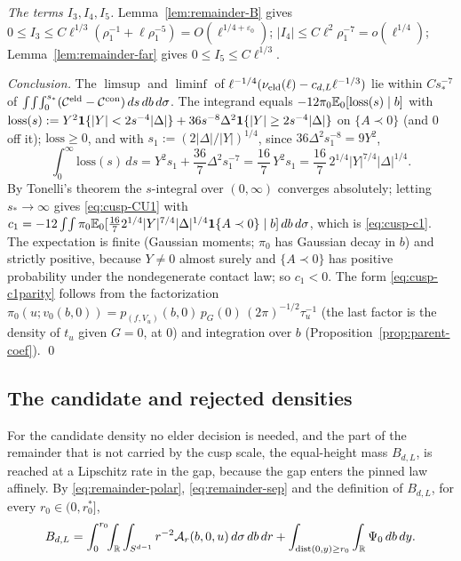 \emph{The terms $I_3,I_4,I_5$.} Lemma~\ref{lem:remainder-B} gives $0\le I_3\le C\ell^{1/3}(\rho_1^{-1}+\ell\rho_1^{-5})=O(\ell^{1/4+\varepsilon_0})$; $|I_4|\le C\ell^2\rho_1^{-7}=o(\ell^{1/4})$; Lemma~\ref{lem:remainder-far} gives $0\le I_5\le C\ell^{1/3}$.

\emph{Conclusion.} The $\limsup$ and $\liminf$ of $\ell^{-1/4}(\nu_{\mathrm{eld}}(\ell)-c_{d,L}\ell^{-1/3})$ lie within $Cs_*^{-7}$ of $\int\!\int\!\int_0^{s_*}(\mathcal C^{\mathrm{eld}}-\mathcal C^{\mathrm{con}})\,ds\,db\,d\sigma$. The integrand equals $-12\pi_0\mathbb E_0[\mathrm{loss}(s)\mid b]$ with $\mathrm{loss}(s):=Y^2\mathbf 1\{|Y|<2s^{-4}|\Delta|\}+36s^{-8}\Delta^2\mathbf 1\{|Y|\ge2s^{-4}|\Delta|\}$ on $\{A\prec0\}$ (and $0$ off it); $\mathrm{loss}\ge0$, and with $s_1:=(2|\Delta|/|Y|)^{1/4}$, since $36\Delta^2s_1^{-8}=9Y^2$,
\begin{equation}\label{eq:cusp-loss}
\int_0^\infty\mathrm{loss}(s)\,ds=Y^2s_1+\frac{36}7\Delta^2s_1^{-7}=\frac{16}7\,Y^2s_1=\frac{16}7\,2^{1/4}|Y|^{7/4}|\Delta|^{1/4}.
\end{equation}
By Tonelli's theorem the $s$-integral over $(0,\infty)$ converges absolutely; letting $s_*\to\infty$ gives \eqref{eq:cusp-CU1} with $c_1=-12\int\!\int\pi_0\mathbb E_0[\frac{16}72^{1/4}|Y|^{7/4}|\Delta|^{1/4}\mathbf 1\{A\prec0\}\mid b]\,db\,d\sigma$, which is \eqref{eq:cusp-c1}. The expectation is finite (Gaussian moments; $\pi_0$ has Gaussian decay in $b$) and strictly positive, because $Y\ne0$ almost surely and $\{A\prec0\}$ has positive probability under the nondegenerate contact law; so $c_1<0$. The form \eqref{eq:cusp-c1parity} follows from the factorization $\pi_0(u;v_0(b,0))=p_{(f,V_u)}(b,0)\,p_G(0)\,(2\pi)^{-1/2}\tau_u^{-1}$ (the last factor is the density of $t_u$ given $G=0$, at $0$) and integration over $b$ \cite[\S15]{parentP} (Proposition~\ref{prop:parent-coef}). \qed

\subsection{The candidate and rejected densities}\label{ssec:cusp-cand}

For the candidate density no elder decision is needed, and the part of the remainder that is not carried by the cusp scale, the equal-height mass $B_{d,L}$, is reached at a Lipschitz rate in the gap, because the gap enters the pinned law affinely. By \eqref{eq:remainder-polar}, \eqref{eq:remainder-sep} and the definition of $B_{d,L}$, for every $r_0\in(0,r_0^*]$,
\begin{equation}\label{eq:cusp-Bsplit}
B_{d,L}=\int_0^{r_0}\!\!\int_\mathbb R\int_{S^{d-1}}r^{-2}\mathcal A_r(b,0,u)\,d\sigma\,db\,dr+\int_{\operatorname{dist}(0,y)\ge r_0}\int_\mathbb R\Psi_0\,db\,dy .
\end{equation}

